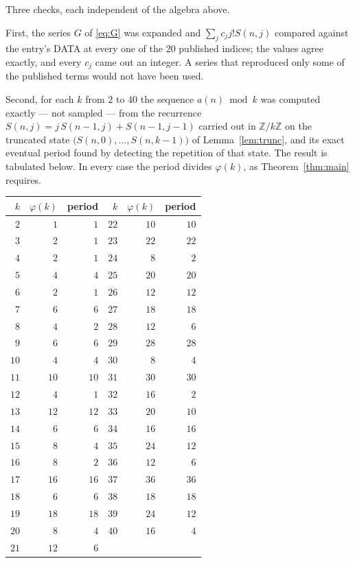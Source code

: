 \documentclass[11pt,a4paper]{article}
\theoremstyle{plain}
\theoremstyle{definition}
\begin{document}
Three checks, each independent of the algebra above.

First, the series $G$ of \eqref{eq:G} was expanded and $\sum_j c_j j! S(n,j)$ compared
against the entry's DATA at every one of the $20$ published indices; the values
agree exactly, and every $c_j$ came out an integer. A series that reproduced only some of
the published terms would not have been used.

Second, for each $k$ from $2$ to $40$ the sequence $a(n)\bmod k$ was computed exactly
--- not sampled --- from the recurrence $S(n,j)=j\,S(n-1,j)+S(n-1,j-1)$ carried out in
$\mathbb{Z}/k\mathbb{Z}$ on the truncated state
$\bigl(S(n,0),\dots,S(n,k-1)\bigr)$ of Lemma~\ref{lem:trunc}, and its exact eventual
period found by detecting the repetition of that state. The result is tabulated below.
In every case the period divides $\varphi(k)$, as Theorem~\ref{thm:main} requires.

\begin{center}\small
\begin{tabular}{rrr@{\qquad\qquad}rrr}
$k$ & $\varphi(k)$ & period & $k$ & $\varphi(k)$ & period \\ \hline
$2$ & $1$ & $1$ & $22$ & $10$ & $10$ \\
$3$ & $2$ & $1$ & $23$ & $22$ & $22$ \\
$4$ & $2$ & $1$ & $24$ & $8$ & $2$ \\
$5$ & $4$ & $4$ & $25$ & $20$ & $20$ \\
$6$ & $2$ & $1$ & $26$ & $12$ & $12$ \\
$7$ & $6$ & $6$ & $27$ & $18$ & $18$ \\
$8$ & $4$ & $2$ & $28$ & $12$ & $6$ \\
$9$ & $6$ & $6$ & $29$ & $28$ & $28$ \\
$10$ & $4$ & $4$ & $30$ & $8$ & $4$ \\
$11$ & $10$ & $10$ & $31$ & $30$ & $30$ \\
$12$ & $4$ & $1$ & $32$ & $16$ & $2$ \\
$13$ & $12$ & $12$ & $33$ & $20$ & $10$ \\
$14$ & $6$ & $6$ & $34$ & $16$ & $16$ \\
$15$ & $8$ & $4$ & $35$ & $24$ & $12$ \\
$16$ & $8$ & $2$ & $36$ & $12$ & $6$ \\
$17$ & $16$ & $16$ & $37$ & $36$ & $36$ \\
$18$ & $6$ & $6$ & $38$ & $18$ & $18$ \\
$19$ & $18$ & $18$ & $39$ & $24$ & $12$ \\
$20$ & $8$ & $4$ & $40$ & $16$ & $4$ \\
$21$ & $12$ & $6$ &  & & \\
\end{tabular}
\end{center}
\end{document}
